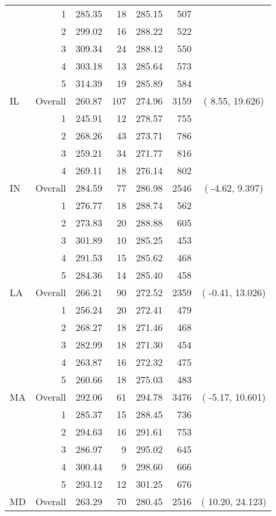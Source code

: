 \begin{longtable}{lrrr@{\extracolsep{.25cm}}rrc}
   & 1 & 285.35 &  18 & 285.15 & 507 &  \\ 
   & 2 & 299.02 &  16 & 288.22 & 522 &  \\ 
   & 3 & 309.34 &  24 & 288.12 & 550 &  \\ 
   & 4 & 303.18 &  13 & 285.64 & 573 &  \\ 
   & 5 & 314.39 &  19 & 285.89 & 584 &  \\ 
   \hline
IL & Overall & 260.87 & 107 & 274.96 & 3159 & (  8.55,  19.626) \\ 
   & 1 & 245.91 &  12 & 278.57 & 755 &  \\ 
   & 2 & 268.26 &  43 & 273.71 & 786 &  \\ 
   & 3 & 259.21 &  34 & 271.77 & 816 &  \\ 
   & 4 & 269.11 &  18 & 276.14 & 802 &  \\ 
   \hline
IN & Overall & 284.59 &  77 & 286.98 & 2546 & ( -4.62,   9.397) \\ 
   & 1 & 276.77 &  18 & 288.74 & 562 &  \\ 
   & 2 & 273.83 &  20 & 288.88 & 605 &  \\ 
   & 3 & 301.89 &  10 & 285.25 & 453 &  \\ 
   & 4 & 291.53 &  15 & 285.62 & 468 &  \\ 
   & 5 & 284.36 &  14 & 285.40 & 458 &  \\ 
   \hline
LA & Overall & 266.21 &  90 & 272.52 & 2359 & ( -0.41,  13.026) \\ 
   & 1 & 256.24 &  20 & 272.41 & 479 &  \\ 
   & 2 & 268.27 &  18 & 271.46 & 468 &  \\ 
   & 3 & 282.99 &  18 & 271.30 & 454 &  \\ 
   & 4 & 263.87 &  16 & 272.32 & 475 &  \\ 
   & 5 & 260.66 &  18 & 275.03 & 483 &  \\ 
   \hline
MA & Overall & 292.06 &  61 & 294.78 & 3476 & ( -5.17,  10.601) \\ 
   & 1 & 285.37 &  15 & 288.45 & 736 &  \\ 
   & 2 & 294.63 &  16 & 291.61 & 753 &  \\ 
   & 3 & 286.97 &   9 & 295.02 & 645 &  \\ 
   & 4 & 300.44 &   9 & 298.60 & 666 &  \\ 
   & 5 & 293.12 &  12 & 301.25 & 676 &  \\ 
   \hline
MD & Overall & 263.29 &  70 & 280.45 & 2516 & ( 10.20,  24.123) \\ 

\end{longtable}
